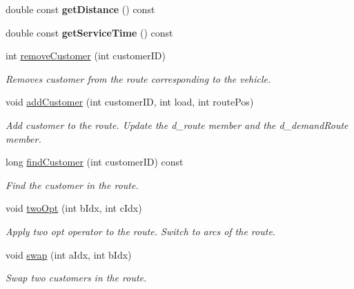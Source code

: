 \begin{DoxyCompactItemize}
double const {\bfseries get\+Distance} () const
\item 
\mbox{\label{class_route_ae30f973f4cb746802cf54d9f1827445f}} 
double const {\bfseries get\+Service\+Time} () const
\item 
int \hyperlink{class_route_a3e52680923dc08fe57d7a622cf8ad17b}{remove\+Customer} (int customer\+ID)
\begin{DoxyCompactList}\small\item\em Removes customer from the route corresponding to the vehicle. \end{DoxyCompactList}\item 
void \hyperlink{class_route_a21490cdf3853d449a2608432596ff622}{add\+Customer} (int customer\+ID, int load, int route\+Pos)
\begin{DoxyCompactList}\small\item\em Add customer to the route. Update the d\+\_\+route member and the d\+\_\+demand\+Route member. \end{DoxyCompactList}\item 
long \hyperlink{class_route_ae8402085cd8be017e3ac15fd8b3a05fd}{find\+Customer} (int customer\+ID) const
\begin{DoxyCompactList}\small\item\em Find the customer in the route. \end{DoxyCompactList}\item 
void \hyperlink{class_route_a7e21fdad3d0539f54a1cefa7b046ab49}{two\+Opt} (int b\+Idx, int c\+Idx)
\begin{DoxyCompactList}\small\item\em Apply two opt operator to the route. Switch to arcs of the route. \end{DoxyCompactList}\item 
void \hyperlink{class_route_a463c649701eb3ed5c659f5e920460335}{swap} (int a\+Idx, int b\+Idx)
\begin{DoxyCompactList}\small\item\em Swap two customers in the route. \end{DoxyCompactList}\end{DoxyCompactItemize}
